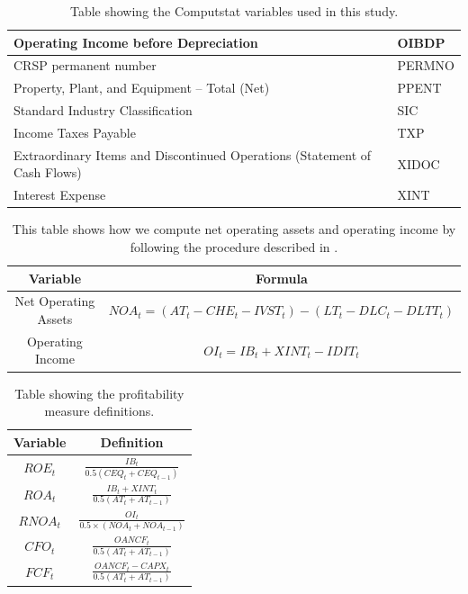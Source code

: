 {\begin{table}[htb!]
\begin{tabular}{|l|l|}
Operating Income before Depreciation                                       & OIBDP         \\ \hline
CRSP permanent number                                                      & PERMNO        \\ \hline
Property, Plant, and Equipment – Total (Net)                               & PPENT         \\ \hline
Standard Industry Classification                                           & SIC           \\ \hline
Income Taxes Payable                                                       & TXP           \\ \hline
Extraordinary Items and Discontinued Operations (Statement of Cash Flows)  & XIDOC         \\ \hline
Interest Expense                                                           & XINT          \\ \hline
\end{tabular}
\caption{Table showing the Computstat variables used in this study.}
\label{tab:CompustatVariables}
\end{table}

\begin{table}[]
\begin{tabular}{|c|c|}
\hline
Variable             & Formula                                                     \\ \hline
Net Operating Assets & $NOA_t = (AT_t - CHE_t - IVST_t) - (LT_t - DLC_t - DLTT_t)$ \\ \hline
Operating Income     & $OI_t=IB_t + XINT_t - IDIT_t$                               \\ \hline
\end{tabular}
\caption{This table shows how we compute net operating assets and operating income  by following the procedure described in \citep{LiTuna2014}. }
\label{tab:ComputstatCompute}
\end{table}

{\renewcommand{\arraystretch}{2}
\begin{table}[htb!]
\centering
\begin{tabular}{|c|c|}
\hline
\textbf{Variable} & \textbf{Definition}                           \\ \hline
$ROE_t$           & $\frac{IB_t}{0.5(CEQ_t + CEQ_{t-1})}$         \\ \hline
$ROA_t$           & $\frac{IB_t + XINT_t}{0.5(AT_t + AT_{t-1})}$    \\ \hline
$RNOA_t$          & $\frac{OI_t}{0.5 \times (NOA_t + NOA_{t-1})}$ \\ \hline
$CFO_t$           & $\frac{OANCF_t}{0.5(AT_t + AT_{t-1})}$          \\ \hline
$FCF_t$           & $\frac{OANCF_t - CAPX_t}{0.5(AT_t + AT_{t-1})}$ \\ \hline
\end{tabular}
\caption{Table showing the profitability measure definitions.}
\label{tab:ProfitMeasures} 


\end{table}}}
